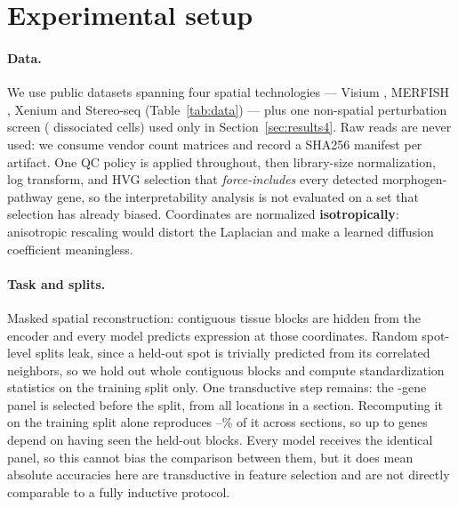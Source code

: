 \section{Experimental setup}
\label{sec:setup}


\paragraph{Data.} We use \NDatasets{} public datasets spanning four spatial
technologies --- Visium \citep{stahl2016visium}, MERFISH
\citep{chen2015merfish}, Xenium \citep{janesick2023xenium} and Stereo-seq
\citep{chen2022mosta} (Table~\ref{tab:data}) --- plus one non-spatial
perturbation screen \citep{dixit2016perturbseq} (\NPerturbCells{} dissociated
cells) used only in Section~\ref{sec:results4}.
Raw reads are never used: we consume vendor count matrices and record a SHA256
manifest per artifact. One QC policy is applied throughout, then library-size
normalization, log transform, and HVG selection that \emph{force-includes} every
detected morphogen-pathway gene, so the interpretability analysis is not
evaluated on a set that selection has already biased. Coordinates are normalized
\textbf{isotropically}: anisotropic rescaling would distort the Laplacian and
make a learned diffusion coefficient meaningless.


\paragraph{Task and splits.} Masked spatial reconstruction: contiguous tissue
blocks are hidden from the encoder and every model predicts expression at those
coordinates. Random spot-level splits leak, since a held-out spot is trivially
predicted from its correlated neighbors, so we hold out whole contiguous blocks
\citep{roberts2017crossvalidation} and compute standardization statistics on the
training split only. One transductive step remains: the \HVGPanelSize{}-gene panel
is selected before the split, from all locations in a section. Recomputing it on
the training split alone reproduces \HVGOverlapLo--\HVGOverlapHi\% of it across
\HVGSections{} sections, so up to \HVGLeakedHi{} genes depend on having seen the
held-out blocks. Every model receives the identical panel, so this cannot bias the
comparison between them, but it does mean absolute accuracies here are transductive
in feature selection and are not directly comparable to a fully inductive protocol.

